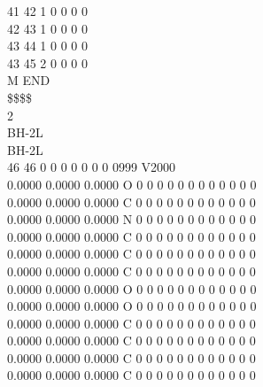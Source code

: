 \documentclass[11pt,titlepage,dvipdfmx,twoside]{jarticle}
\begin{document}
\begin{oframed}
{ 41 42  1  0  0  0  0                                                      \\
 42 43  1  0  0  0  0                                                      \\
 43 44  1  0  0  0  0                                                      \\
 43 45  2  0  0  0  0                                                      \\
M  END                                                                     \\
\$\$\$\$                                                                       \\
2                                                                          \\
BH-2L                                                                      \\
BH-2L                                                                      \\
 46 46  0  0  0  0  0  0  0  0999 V2000                                    \\
    0.0000    0.0000    0.0000  O  0  0  0  0  0  0  0  0  0  0  0  0      \\
    0.0000    0.0000    0.0000  C  0  0  0  0  0  0  0  0  0  0  0  0      \\
    0.0000    0.0000    0.0000  N  0  0  0  0  0  0  0  0  0  0  0  0      \\
    0.0000    0.0000    0.0000  C  0  0  0  0  0  0  0  0  0  0  0  0      \\
    0.0000    0.0000    0.0000  C  0  0  0  0  0  0  0  0  0  0  0  0      \\
    0.0000    0.0000    0.0000  C  0  0  0  0  0  0  0  0  0  0  0  0      \\
    0.0000    0.0000    0.0000  O  0  0  0  0  0  0  0  0  0  0  0  0      \\
    0.0000    0.0000    0.0000  O  0  0  0  0  0  0  0  0  0  0  0  0      \\
    0.0000    0.0000    0.0000  C  0  0  0  0  0  0  0  0  0  0  0  0      \\
    0.0000    0.0000    0.0000  C  0  0  0  0  0  0  0  0  0  0  0  0      \\
    0.0000    0.0000    0.0000  C  0  0  0  0  0  0  0  0  0  0  0  0      \\
    0.0000    0.0000    0.0000  C  0  0  0  0  0  0  0  0  0  0  0  0      \\
}
\end{oframed}
\end{document}

